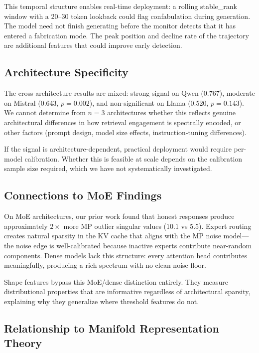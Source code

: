 \documentclass[11pt,a4paper]{article}
\begin{document}
This temporal structure enables real-time deployment: a rolling
stable\_rank window with a 20--30 token lookback could flag
confabulation during generation. The model need not finish generating
before the monitor detects that it has entered a fabrication mode. The
peak position and decline rate of the trajectory are additional
features that could improve early detection.

\subsection{Architecture Specificity}

The cross-architecture results are mixed: strong signal on Qwen
(0.767), moderate on Mistral (0.643, $p = 0.002$), and non-significant on Llama (0.520, $p = 0.143$). We
cannot determine from $n=3$ architectures whether this reflects
genuine architectural differences in how retrieval engagement is
spectrally encoded, or other factors (prompt design, model size
effects, instruction-tuning differences).

If the signal is architecture-dependent, practical deployment would
require per-model calibration. Whether this is feasible at scale
depends on the calibration sample size required, which we have not
systematically investigated.

\subsection{Connections to MoE Findings}

On MoE architectures, our prior work found that honest responses
produce approximately $2\times$ more MP outlier singular values
($10.1$ vs $5.5$). Expert routing creates natural sparsity in the
KV cache that aligns with the MP noise model---the noise edge is
well-calibrated because inactive experts contribute near-random
components. Dense models lack this structure: every attention head
contributes meaningfully, producing a rich spectrum with no clean
noise floor.

Shape features bypass this MoE/dense distinction entirely. They
measure distributional properties that are informative regardless of
architectural sparsity, explaining why they generalize where threshold
features do not.

\subsection{Relationship to Manifold Representation Theory}
\end{document}
